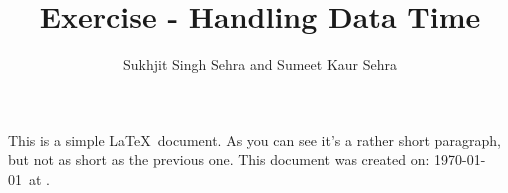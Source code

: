 \documentclass[12pt]{article}
\author{Sukhjit Singh Sehra and Sumeet Kaur Sehra}
\title{Exercise - Handling Data Time}
\begin{document}
\maketitle

This is a simple \LaTeX\ document.
As you can see it's a rather short paragraph, but not 
as short as the previous one. This document was 
created on: \today\ at \currenttime.
\end{document}
